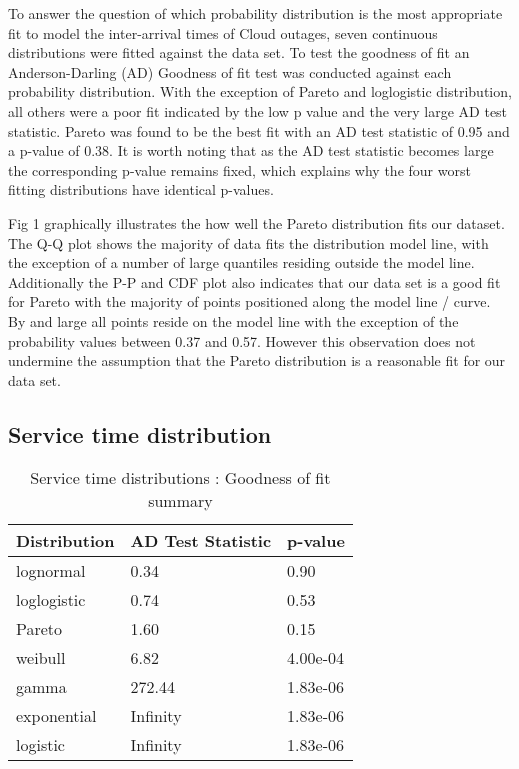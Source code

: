 \documentclass[5p]{elsarticle}
\begin{document}
To answer the question of which probability distribution is the most appropriate fit to model the inter-arrival times of Cloud outages, seven continuous distributions were fitted against the data set. To test the goodness of fit an Anderson-Darling (AD) Goodness of fit test was conducted against each probability distribution. With the exception of Pareto and loglogistic distribution, all others were a poor fit indicated by the low p value and the very large AD test statistic. Pareto was found to be the best fit with an AD test statistic of 0.95 and a p-value of 0.38. It is worth noting that as the AD test statistic becomes large the corresponding p-value remains fixed, which explains why the four worst fitting distributions have identical p-values.

Fig 1 graphically illustrates the how well the Pareto distribution fits our dataset. The Q-Q plot shows the majority of data fits the distribution model line, with the exception of a number of large quantiles residing outside the model line. Additionally the P-P and CDF plot also indicates that our data set is a good fit for Pareto with the majority of points positioned along the model line / curve. By and large all points reside on the model line with the exception of the probability values between 0.37 and 0.57. However this observation does not undermine the assumption that the Pareto distribution is a reasonable fit for our data set. 

\subsection{Service time distribution}

\begin {table}
\caption {Service time distributions :  Goodness of fit summary} 
\begin{center}
\begin{tabular}{p{2.1cm} |  p{3.1cm} | p{1.3cm}} \hline \bf{Distribution} & \bf{AD Test Statistic} & \bf{p-value}
\\ \hline lognormal & 0.34 & 0.90
\\ loglogistic & 0.74 & 0.53
\\ Pareto & 1.60 & 0.15 
\\ weibull  & 6.82 & 4.00e-04 
\\ gamma & 272.44 & 1.83e-06	
\\ exponential & Infinity & 1.83e-06
\\ logistic & Infinity  & 1.83e-06	
\\ \hline
\end{tabular}
\end{center}
\end{table}
\end{document}
